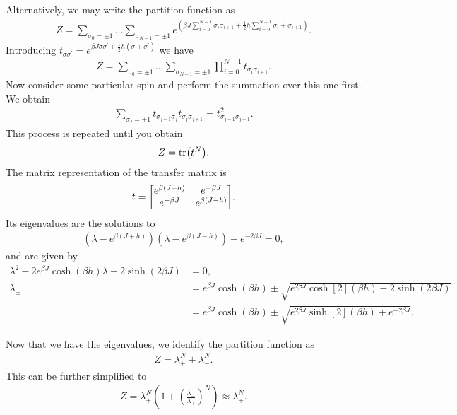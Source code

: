 Alternatively, we may write the partition function as
\begin{align*}
	Z = \sum\limits_{\sigma_{0} = \pm 1}\dots \sum\limits_{\sigma_{N - 1} = \pm 1}e^{\left(\beta J\sum\limits_{i = 0}^{N - 1}\sigma_{i}\sigma_{i + 1} + \frac{1}{2}h\sum\limits_{i = 0}^{N - 1}\sigma_{i} + \sigma_{i + 1}\right)}.
\end{align*}
Introducing $t_{\sigma\sigma^{\prime}} = e^{\beta J\sigma\sigma^{\prime} + \frac{1}{2}h(\sigma + \sigma^{\prime})}$ we have
\begin{align*}
	Z = \sum\limits_{\sigma_{0} = \pm 1}\dots \sum\limits_{\sigma_{N - 1} = \pm 1}\prod\limits_{i = 0}^{N - 1}t_{\sigma_{i}\sigma_{i + 1}}.
\end{align*}
Now consider some particular spin and perform the summation over this one first. We obtain
\begin{align*}
	\sum\limits_{\sigma_{j} = \pm 1}t_{\sigma_{j - 1}\sigma_{j}}t_{\sigma_{j}\sigma_{j + 1}} = t_{\sigma_{j - 1}\sigma_{j + 1}}^{2}.
\end{align*}
This process is repeated until you obtain
\begin{align*}
	Z = \tr(t^{N}).
\end{align*}
The matrix representation of the transfer matrix is
\begin{align*}
	t =
	\mqty[
		e^{\beta(J + h)}  & e^{-\beta J} \\
		e^{-\beta J} & e^{\beta(J - h)}
	].
\end{align*}
Its eigenvalues are the solutions to
\begin{align*}
	\left(\lambda - e^{\beta(J + h)}\right)\left(\lambda - e^{\beta(J - h)}\right) - e^{-2\beta J} = 0,
\end{align*}
and are given by
\begin{align*}
	\lambda^{2} - 2e^{\beta J}\cosh(\beta h)\lambda + 2\sinh(2\beta J) &= 0, \\
	\lambda_{\pm}                                                      &= e^{\beta J}\cosh(\beta h) \pm \sqrt{e^{2\beta J}\cosh[2](\beta h) - 2\sinh(2\beta J)} \\
	                                                                   &= e^{\beta J}\cosh(\beta h) \pm \sqrt{e^{2\beta J}\sinh[2](\beta h) + e^{-2\beta J}}.	
\end{align*}

Now that we have the eigenvalues, we identify the partition function as
\begin{align*}
	Z = \lambda_{+}^{N} + \lambda_{-}^{N}.
\end{align*}
This can be further simplified to
\begin{align*}
	Z = \lambda_{+}^{N}\left(1 + \left(\frac{\lambda_{-}}{\lambda_{+}}\right)^{N}\right) \approx \lambda_{+}^{N}.
\end{align*}

